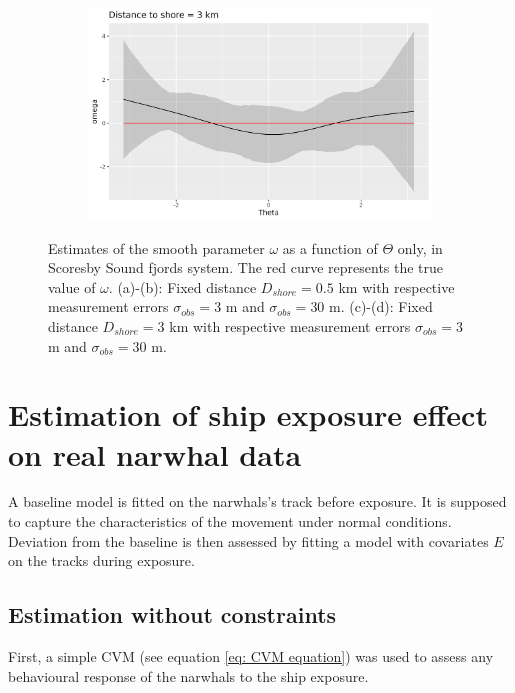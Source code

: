 \documentclass[11pt]{article}
\newcommand {\1}{\mathbb{1}}
\begin{document}
\begin{figure}[H]
\begin{subfigure}{0.48\textwidth}
		\caption{}
	\end{subfigure}
	\begin{subfigure}{0.48\textwidth}
		\centering
		\includegraphics[scale=0.3]{images/simulation study/crcvm_fjords_hf_ne1_omega_far.png}
		\caption{}
	\end{subfigure}
	
	\caption{Estimates of the smooth parameter $\omega$ as a function of $\Theta$ only, in Scoresby Sound fjords system. The red curve represents the true value of $\omega$. (a)-(b): Fixed distance $D_{shore}=0.5$ km with respective measurement errors $\sigma_{obs}=3$ m and $\sigma_{obs}=30$ m. (c)-(d): Fixed distance $D_{shore}=3$ km with respective measurement errors $\sigma_{obs}=3$ m and $\sigma_{obs}=30$ m.}
	\label{fig: marginal_estimates_fjords_CRCVM}

\end{figure}



\section{Estimation of ship exposure effect on real narwhal data}

A baseline model is fitted on the narwhals's track before exposure. It is supposed to capture the characteristics of the movement under normal conditions. Deviation from the baseline is then assessed by fitting a model with covariates $E$ on the tracks during exposure.

\subsection{Estimation without constraints}

First, a simple CVM (see equation \ref{eq: CVM equation}) was used to assess any behavioural response of the narwhals to the ship exposure.
\end{document}
